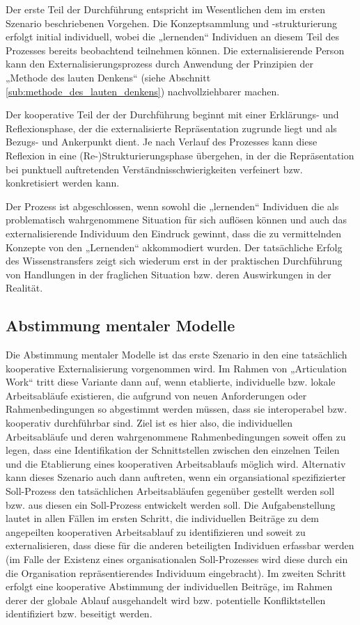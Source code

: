 Der erste Teil der Durchführung entspricht im Wesentlichen dem im ersten Szenario beschriebenen Vorgehen. Die Konzeptsammlung und -strukturierung erfolgt initial individuell, wobei die „lernenden“ Individuen an diesem Teil des Prozesses bereits beobachtend teilnehmen können. Die externalisierende Person kann den Externalisierungsprozess durch Anwendung der Prinzipien der „Methode des lauten Denkens“ (siehe Abschnitt \ref{sub:methode_des_lauten_denkens}) nachvollziehbarer machen. 

Der kooperative Teil der der Durchführung beginnt mit einer Erklärungs- und Reflexionsphase, der die externalisierte Repräsentation zugrunde liegt und als Bezugs- und Ankerpunkt dient. Je nach Verlauf des Prozesses kann diese Reflexion in eine (Re-)Strukturierungsphase übergehen, in der die Repräsentation bei punktuell auftretenden Verständnisschwierigkeiten verfeinert bzw. konkretisiert werden kann. 

Der Prozess ist abgeschlossen, wenn sowohl die „lernenden“ Individuen die als problematisch wahrgenommene Situation für sich auflösen können und auch das externalisierende Individuum den Eindruck gewinnt, dass die zu vermittelnden Konzepte von den „Lernenden“ akkommodiert wurden. Der tatsächliche Erfolg des Wissenstransfers zeigt sich wiederum erst in der praktischen Durchführung von Handlungen in der fraglichen Situation bzw. deren Auswirkungen in der Realität.


\subsection{Abstimmung mentaler Modelle} %
\label{sub:abstimmung_individueller_mentaler_modelle}

Die Abstimmung mentaler Modelle ist das erste Szenario in den eine tatsächlich kooperative Externalisierung vorgenommen wird. Im Rahmen von „Articulation Work“ tritt diese Variante dann auf, wenn etablierte, individuelle bzw. lokale Arbeitsabläufe existieren, die aufgrund von neuen Anforderungen oder Rahmenbedingungen so abgestimmt werden müssen, dass sie interoperabel bzw. kooperativ durchführbar sind. Ziel ist es hier also, die individuellen Arbeitsabläufe und deren wahrgenommene Rahmenbedingungen soweit offen zu legen, dass eine Identifikation der Schnittstellen zwischen den einzelnen Teilen und die Etablierung eines kooperativen Arbeitsablaufs möglich wird. Alternativ kann dieses Szenario auch dann auftreten, wenn ein organsiational spezifizierter Soll-Prozess den tatsächlichen Arbeitsabläufen gegenüber gestellt werden soll bzw. aus diesen ein Soll-Prozess entwickelt werden soll. Die Aufgabenstellung lautet in allen Fällen im ersten Schritt, die individuellen Beiträge zu dem angepeilten kooperativen Arbeitsablauf zu identifizieren und soweit zu externalisieren, dass diese für die anderen beteiligten Individuen erfassbar werden (im Falle der Existenz eines organisationalen Soll-Prozesses wird diese durch ein die Organisation repräsentierendes Individuum eingebracht). Im zweiten Schritt erfolgt eine kooperative Abstimmung der individuellen Beiträge, im Rahmen derer der globale Ablauf ausgehandelt wird bzw. potentielle Konfliktstellen identifiziert bzw. beseitigt werden.

